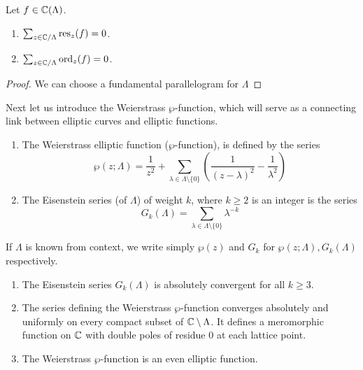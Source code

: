 \begin{proposition}
	\label{prop:residue}
	Let $f \in \mathbb{C}(\Lambda)$.
	\begin{enumerate}[label=(\alph*)]
		\item $\sum_{z \in \mathbb{C}/\Lambda} \operatorname{res}_z(f) = 0$.
		\item $\sum_{z \in \mathbb{C}/\Lambda} \operatorname{ord}_z(f) = 0$.
	\end{enumerate}
\end{proposition}

\begin{proof}
	We can choose a fundamental parallelogram for $\Lambda$
\end{proof}

Next let us introduce the Weierstrass $\wp$-function, which will serve
as a connecting link between elliptic curves and elliptic functions.

\begin{definition}
	\begin{enumerate}[label=(\alph*)]
		\item
			The Weierstrass
			elliptic function ($\wp$-function),
			is defined by the series
			\begin{equation*}
				\wp(z; \Lambda) = \frac{1}{z^2}
				+ \sum_{\lambda \in \Lambda\setminus\{0\}}
				\left(
					\frac{1}{(z-\lambda)^2} - \frac{1}{\lambda^2}
				\right)
			\end{equation*}
		\item
			The Eisenstein series (of $\Lambda$) of weight $k$,
			where $k \geq 2$ is an integer
			is the series
			\begin{equation*}
				G_k(\Lambda) = \sum_{\lambda \in \Lambda\setminus\{0\}}
				\lambda^{-k}
			\end{equation*}
	\end{enumerate}
\end{definition}

\begin{notation}
	If $\Lambda$ is known from context, we write simply
	$\wp(z)$ and $G_k$ for $\wp(z; \Lambda), G_k(\Lambda)$
	respectively.
\end{notation}

\begin{proposition}
	\label{prop:wp-properties}
	\begin{enumerate}[label=(\alph*)]
		\item	The Eisenstein series $G_k(\Lambda)$ is absolutely convergent
			for all $k \geq 3$.
		\item The series defining the Weierstrass $\wp$-function converges
			absolutely and uniformly on every compact subset of
			$\mathbb{C}\setminus\Lambda$. It defines a meromorphic function on $\mathbb{C}$ with 
			double poles of residue 0 at each lattice point.
		\item The Weierstrass $\wp$-function is an even elliptic function.
	\end{enumerate}
\end{proposition}

